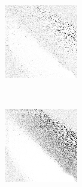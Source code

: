 \begin{figure}
\begin{subfigure}[t]{0.22\textwidth}
		\caption{\handmaxavg}
	\end{subfigure}
~
	\begin{subfigure}[t]{0.22\textwidth}
		\center
		\includegraphics[width=\textwidth]{images/findings/experiments/regularization/strats/0.50/hand_max_med.png}
		\caption{\handmaxmed}
	\end{subfigure}
	~
	\begin{subfigure}[t]{0.22\textwidth}
		\center
		\includegraphics[width=\textwidth]{images/findings/experiments/regularization/strats/0.50/hand_max_poss.png}
		\caption{\handmaxposs}
	\end{subfigure}


\end{figure}
